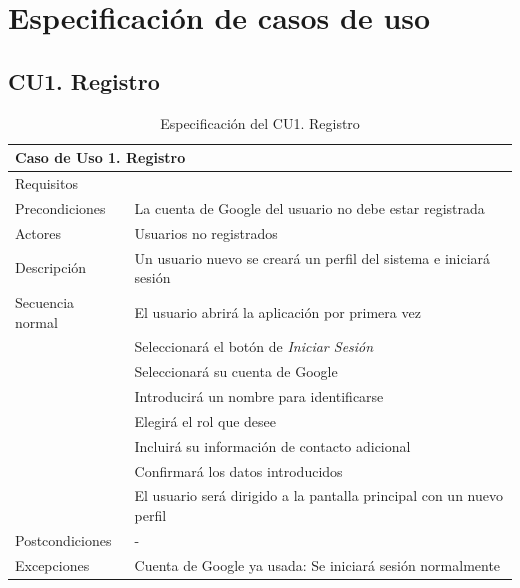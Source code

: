 \chapter{Especificación de casos de uso}
\label{chap:casos_uso}

\section{CU1. Registro}
\label{sec:cu:registro}

\begin{table}[H]
    \centering
    \begin{tabular}{|p{} p{}|}
    \hline
    \multicolumn{2}{|l|}{\textbf{Caso de Uso 1. Registro}} \\ \hline \hline
    Requisitos          & {req:registro} \\ \hline
    Precondiciones      & La cuenta de Google del usuario no debe estar registrada \\ \hline
    Actores             & Usuarios no registrados \\ \hline
    Descripción         & Un usuario nuevo se creará un perfil del sistema e iniciará sesión \\ \hline
    Secuencia normal    & El usuario abrirá la aplicación por primera vez \\
                        & Seleccionará el botón de \emph{Iniciar Sesión} \\
                        & Seleccionará su cuenta de Google \\
                        & Introducirá un nombre para identificarse \\
                        & Elegirá el rol que desee \\
                        & Incluirá su información de contacto adicional \\
                        & Confirmará los datos introducidos \\
                        & El usuario será dirigido a la pantalla principal con un nuevo perfil \\ \hline
    Postcondiciones     & -  \\ \hline
    Excepciones         & Cuenta de Google ya usada: Se iniciará sesión normalmente  \\ \hline
    \end{tabular}
    \caption{Especificación del CU1. Registro}
    \label{cu:registro}
\end{table}

